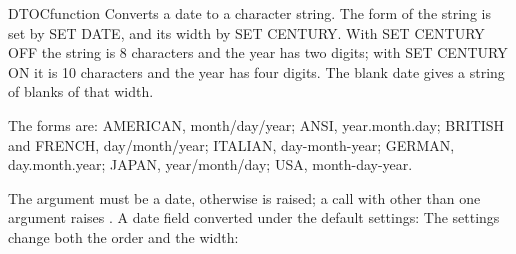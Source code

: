 \begin{XbaseEntry}{DTOC}{function}
Converts a date to a character string.
\Syntax
{}
\Usage
The form of the string is set by SET DATE, and its width by SET CENTURY. With SET CENTURY OFF the string is 8 characters and the year has two digits; with SET CENTURY ON it is 10 characters and the year has four digits. The blank date gives a string of blanks of that width.

The forms are: AMERICAN, month/day/year; ANSI, year.month.day; BRITISH and FRENCH, day/month/year; ITALIAN, day-month-year; GERMAN, day.month.year; JAPAN, year/month/day; USA, month-day-year.

The argument must be a date, otherwise  is raised; a call with other than one argument raises .
\Examples
A date field converted under the default settings:
The settings change both the order and the width:
\end{XbaseEntry}

